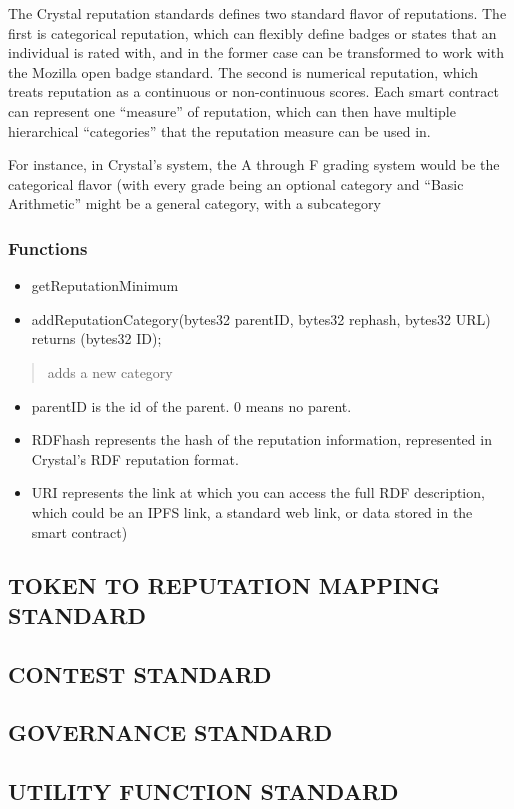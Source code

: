 The Crystal reputation standards defines two standard flavor of
reputations. The first is categorical reputation, which can flexibly
define badges or states that an individual is rated with, and in the
former case can be transformed to work with the Mozilla open badge
standard. The second is numerical reputation, which treats reputation as
a continuous or non-continuous scores. Each smart contract can represent
one ``measure'' of reputation, which can then have multiple hierarchical
``categories'' that the reputation measure can be used in.

For instance, in Crystal's system, the A through F grading system would
be the categorical flavor (with every grade being an optional category
and ``Basic Arithmetic'' might be a general category, with a subcategory

\subsubsection{Functions}\label{functions-1}

\begin{itemize}
\item
  getReputationMinimum
\item
  addReputationCategory(bytes32 parentID, bytes32 rephash, bytes32 URL)
  returns (bytes32 ID);
\end{itemize}

\begin{quote}
adds a new category
\end{quote}

\begin{itemize}
\item
  parentID is the id of the parent. 0 means no parent.
\item
  RDFhash represents the hash of the reputation information, represented
  in Crystal's RDF reputation format.
\item
  URI represents the link at which you can access the full RDF
  description, which could be an IPFS link, a standard web link, or data
  stored in the smart contract)
\end{itemize}

\subsection{TOKEN TO REPUTATION MAPPING
STANDARD}\label{token-to-reputation-mapping-standard}

\subsection{CONTEST STANDARD}\label{contest-standard-1}

\subsection{GOVERNANCE STANDARD}\label{governance-standard-1}

\subsection{UTILITY FUNCTION STANDARD}\label{utility-function-standard}
